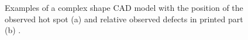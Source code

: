 \begin{figure}
    \centering
    \qquad
    \caption[Examples of hot spot defects.]{Examples of a complex shape CAD model with the position of the observed hot spot (a) and relative observed defects in printed part (b) \cite{grasso_-process_2017}.}
\end{figure}
